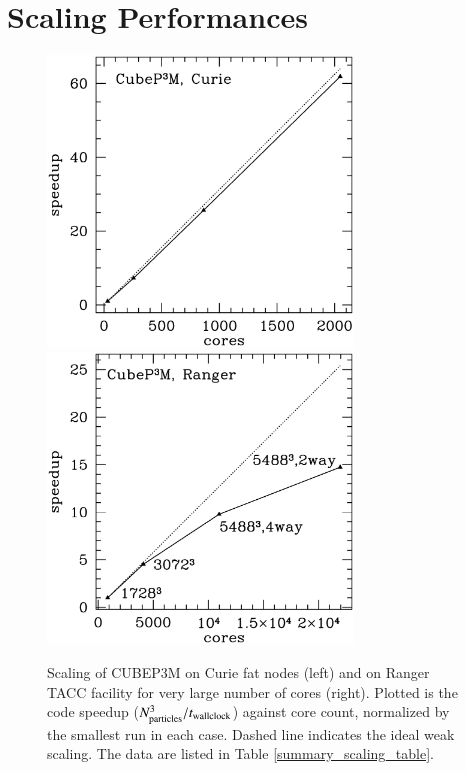 \section{Scaling Performances}
\label{sec:scaling}

\begin{figure}%
  \begin{center}
    \includegraphics[width=3.2in]{graphs/scaling_cubep3m_curie.eps}
    \includegraphics[width=3.2in]{graphs/scaling_cubep3m_new.eps}
  \caption{Scaling of {\small CUBEP3M} on Curie fat nodes (left) and 
    on Ranger TACC facility for very large number of cores (right). Plotted is the code speedup 
    ($N_{\rm particles}^3/t_{\rm wallclock}$) against core count, normalized by the smallest run 
    in each case. Dashed line indicates the ideal weak 
    scaling. The data are listed in Table \ref{summary_scaling_table}.
    \label{scaling}
}
\end{center}
\end{figure}

